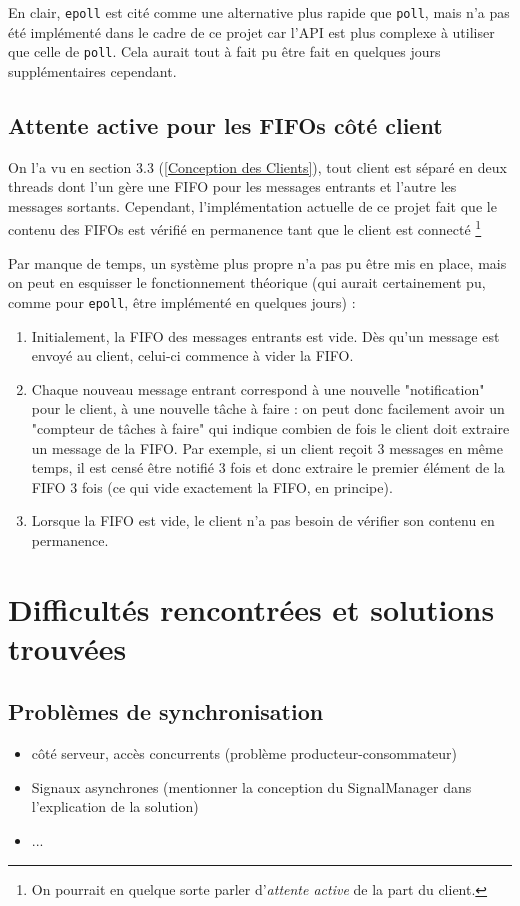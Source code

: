 \documentclass{article}
\begin{document}
En clair, \texttt{epoll} est cité comme une alternative plus rapide que \texttt{poll}, mais n'a pas été implémenté dans le cadre de ce projet car l'API est plus complexe à utiliser que celle de \texttt{poll}. Cela aurait tout à fait pu être fait en quelques jours supplémentaires cependant.

\subsection{Attente active pour les FIFOs côté client}
On l'a vu en section 3.3 (\ref{Conception des Clients}), tout client est séparé en deux threads dont l'un gère une FIFO pour les messages entrants et l'autre les messages sortants. Cependant, l'implémentation actuelle de ce projet fait que le contenu des FIFOs est vérifié en permanence tant que le client est connecté \footnote{On pourrait en quelque sorte parler d'\textit{attente active} de la part du client. }

Par manque de temps, un système plus propre n'a pas pu être mis en place, mais on peut en esquisser le fonctionnement théorique (qui aurait certainement pu, comme pour \texttt{epoll}, être implémenté en quelques jours) :
\begin{enumerate}
    \item Initialement, la FIFO des messages entrants est vide. Dès qu'un message est envoyé au client, celui-ci commence à vider la FIFO. 
    \item Chaque nouveau message entrant correspond à une nouvelle "notification" pour le client, à une nouvelle tâche à faire : on peut donc facilement avoir un "compteur de tâches à faire" qui indique combien de fois le client doit extraire un message de la FIFO. Par exemple, si un client reçoit 3 messages en même temps, il est censé être notifié 3 fois et donc extraire le premier élément de la FIFO 3 fois (ce qui vide exactement la FIFO, en principe). 
    \item Lorsque la FIFO est vide, le client n'a pas besoin de vérifier son contenu en permanence.
\end{enumerate}

\section{Difficultés rencontrées et solutions trouvées}
\subsection{Problèmes de synchronisation}
\begin{itemize}
    \item côté serveur, accès concurrents (problème producteur-consommateur)
    \item Signaux asynchrones (mentionner la conception du SignalManager dans l'explication de la solution)
    \item ...
\end{itemize}
\end{document}
